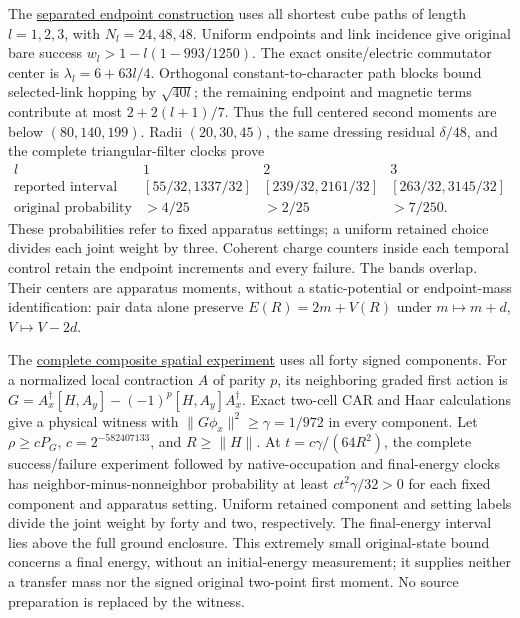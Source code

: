 The \href{https://github.com/FloatingPragma/observer-patch-holography/blob/main/model/particle_candidate_endpoint_threshold/PROOF.md}{separated endpoint construction}
uses all shortest cube paths of length $l=1,2,3$, with $N_l=24,48,48$.
Uniform endpoints and link incidence give original bare success
$w_l>1-l(1-993/1250)$. The exact onsite/electric commutator center is
$\lambda_l=6+63l/4$. Orthogonal constant-to-character path blocks bound
selected-link hopping by $\sqrt{40l}$; the remaining endpoint and magnetic
terms contribute at most $2+2(l+1)/7$. Thus the full centered second
moments are below $(80,140,199)$. Radii $(20,30,45)$, the same dressing
residual $\delta/48$, and the complete triangular-filter clocks prove
\[
\begin{array}{c|ccc}
l&1&2&3\\ \hline
\text{reported interval}&[55/32,1337/32]&[239/32,2161/32]&[263/32,3145/32]\\
\text{original probability}&>4/25&>2/25&>7/250 .
\end{array}
\]
These probabilities refer to fixed apparatus settings; a uniform retained
choice divides each joint weight by three. Coherent charge counters inside
each temporal control retain the endpoint increments and every failure.
The bands overlap. Their centers are apparatus moments, without a
static-potential or endpoint-mass identification: pair data alone preserve
$E(R)=2m+V(R)$ under $m\mapsto m+d$, $V\mapsto V-2d$.

The \href{https://github.com/FloatingPragma/observer-patch-holography/blob/main/model/particle_candidate_composite_spectrum/PROOF.md}{complete composite spatial experiment}
uses all forty signed components. For a normalized local contraction $A$
of parity $p$, its neighboring graded first action is
$G=A_x^\dagger[H,A_y]-(-1)^p[H,A_y]A_x^\dagger$.
Exact two-cell CAR and Haar calculations give a physical witness with
$\|G\phi_x\|^2\ge\gamma=1/972$ in every component.
Let $\rho\ge cP_G$, $c=2^{-582407133}$, and $R\ge\|H\|$.
At $t=c\gamma/(64R^2)$, the complete success/failure experiment followed
by native-occupation and final-energy clocks has neighbor-minus-nonneighbor
probability at least $ct^2\gamma/32>0$ for each fixed component and
apparatus setting. Uniform retained component and setting labels divide
the joint weight by forty and two, respectively. The final-energy interval lies
above the full ground enclosure. This extremely small original-state
bound concerns a final energy, without an initial-energy measurement;
it supplies neither a transfer mass nor the signed original two-point
first moment. No source preparation is replaced by the witness.

